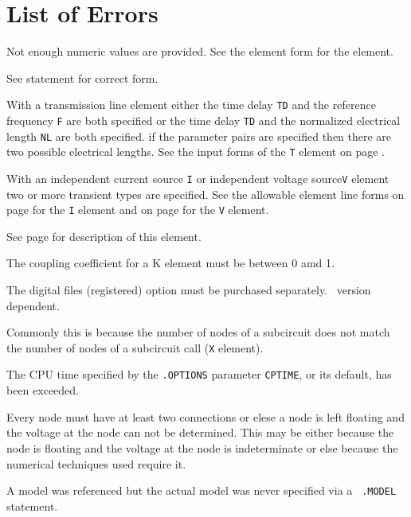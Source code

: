 \section{List of Errors}

Not enough numeric values are provided. See the element form for the element.

See statement for correct form.

With a transmission line element either the time delay {\tt TD}
and the reference frequency {\tt F} are both specified or the time delay {\tt TD}
and the normalized electrical length {\tt NL} are both specified.
if the parameter pairs are specified then there are two possible electrical
lengths.  See the input forms of the {\tt T} element on page \pageref{Telement}.

With an independent current source {\tt I} or independent 
voltage source{\tt V} element two or more transient types
are specified. See the allowable element line forms on
page \pageref{Ielement} for the {\tt I} element and on page
\pageref{Velement} for the {\tt V} element.

See page \pageref{Yelement} for description of this element.

           The coupling coefficient for a K element must be between 0 amd 1.

The digital files (registered) option must be purchased separately.
\justspice\ version dependent.

Commonly this is because the number of nodes of a subcircuit does not match the
number of nodes of a subcircuit call ({\tt X} element).

The CPU time specified by the {\tt .OPTIONS} parameter {\tt CPTIME}, or its
default, has been exceeded.

Every node must have at least two connections or elese a node is left
floating and the voltage at the node can not be determined. This may be
either because the node is floating and the voltage at the node is
indeterminate or else because the numerical techniques used require it.

A model was referenced but the actual model was never specified via a {\tt
.MODEL} statement.

